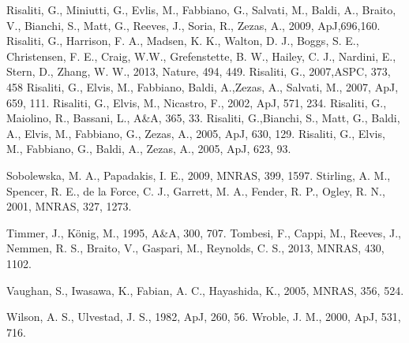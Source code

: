 \documentclass[letters,useAMS,usenatbib]{samnote}
\begin{document}
\begin{thebibliography}{99}
     Risaliti, G., Miniutti, G., Evlis, M., Fabbiano, G., Salvati, M., Baldi, A., Braito, V., 
									 Bianchi, S., Matt, G., Reeves, J., Soria, R., Zezas, A., 2009, ApJ,696,160. 
     Risaliti, G., Harrison, F. A., Madsen, K. K., Walton, D. J., Boggs, S. E., Christensen,  F. E., 
							Craig, W.W., Grefenstette, B. W., Hailey, C. J., Nardini, E., Stern, D., Zhang, W. W., 2013, Nature, 494, 449. 
     Risaliti, G., 2007,ASPC, 373, 458
     Risaliti, G., Elvis, M., Fabbiano, Baldi, A.,Zezas, A., Salvati, M., 2007, ApJ, 659, 111.
     Risaliti, G., Elvis, M., Nicastro, F., 2002, ApJ, 571, 234.
     Risaliti, G., Maiolino, R., Bassani, L., A\&A, 365, 33.
     Risaliti, G.,Bianchi, S., Matt, G., Baldi, A., Elvis, M., Fabbiano, G., Zezas, A., 2005, ApJ,
    630, 129.
     Risaliti, G., Elvis, M., Fabbiano, G., Baldi, A., Zezas, A., 2005, ApJ, 623, 93.
    
     Sobolewska, M. A., Papadakis, I. E., 2009, MNRAS, 399, 1597.
     Stirling, A. M., Spencer, R. E., de la Force, C. J., Garrett, M. A., Fender, R. P., Ogley, R.
N., 2001, MNRAS, 327, 1273.
    
     Timmer, J., K\"{o}nig, M., 1995, A\&A, 300, 707.
     Tombesi, F., Cappi, M., Reeves, J., Nemmen, R. S., Braito, V., Gaspari, M., Reynolds, C. S., 2013,
    MNRAS, 430, 1102.
    
     Vaughan, S., Iwasawa, K., Fabian, A. C., Hayashida, K., 2005, MNRAS, 356, 524.
    
     Wilson, A. S., Ulvestad, J. S., 1982, ApJ, 260, 56.
     Wroble, J. M., 2000, ApJ, 531, 716.
    
\end{thebibliography}



\label{lastpage}
\end{document}
